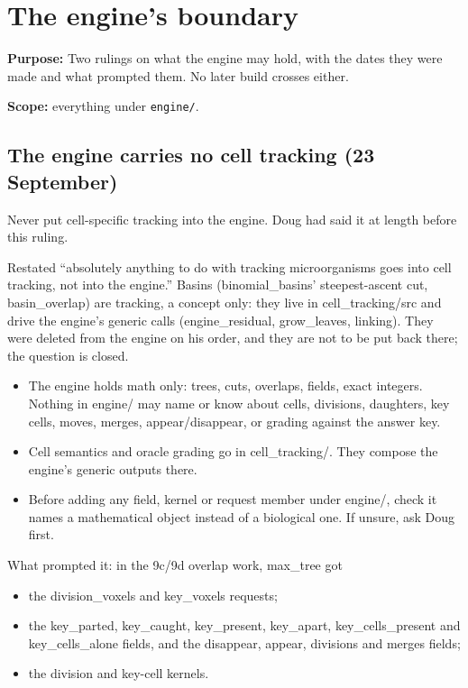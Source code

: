 \chapter{\texorpdfstring{The engine's boundary}{The engine's boundary}}
\label{chap:engine-boundary}

\textbf{Purpose:} Two rulings on what the engine may hold, with the dates they were made and what prompted them. No later build crosses either.

\textbf{Scope:} everything under \texttt{engine/\allowbreak{}}.

\section{\texorpdfstring{The engine carries no cell tracking (23 September)}{The engine carries no cell tracking (23 September)}}

Never put cell-specific tracking into the engine. Doug had said it at length before this ruling.

Restated “absolutely anything to do with tracking microorganisms goes into cell tracking, not into the engine.” Basins (binomial\_\allowbreak{}basins' steepest-ascent cut, basin\_\allowbreak{}overlap) are tracking, a concept only: they live in cell\_\allowbreak{}tracking/src and drive the engine's generic calls (engine\_\allowbreak{}residual, grow\_\allowbreak{}leaves, linking). They were deleted from the engine on his order, and they are not to be put back there; the question is closed.

\begin{itemize}
\item The engine holds math only: trees, cuts, overlaps, fields, exact integers. Nothing in engine/ may name or know about cells, divisions, daughters, key cells, moves, merges, appear/disappear, or grading against the answer key.
\item Cell semantics and oracle grading go in cell\_\allowbreak{}tracking/. They compose the engine's generic outputs there.
\item Before adding any field, kernel or request member under engine/, check it names a mathematical object instead of a biological one. If unsure, ask Doug first.
\end{itemize}

What prompted it: in the 9c/9d overlap work, max\_\allowbreak{}tree got

\begin{itemize}
\item the division\_\allowbreak{}voxels and key\_\allowbreak{}voxels requests;
\item the key\_\allowbreak{}parted, key\_\allowbreak{}caught, key\_\allowbreak{}present, key\_\allowbreak{}apart, key\_\allowbreak{}cells\_\allowbreak{}present and key\_\allowbreak{}cells\_\allowbreak{}alone fields, and the disappear, appear, divisions and merges fields;
\item the division and key-cell kernels.
\end{itemize}

